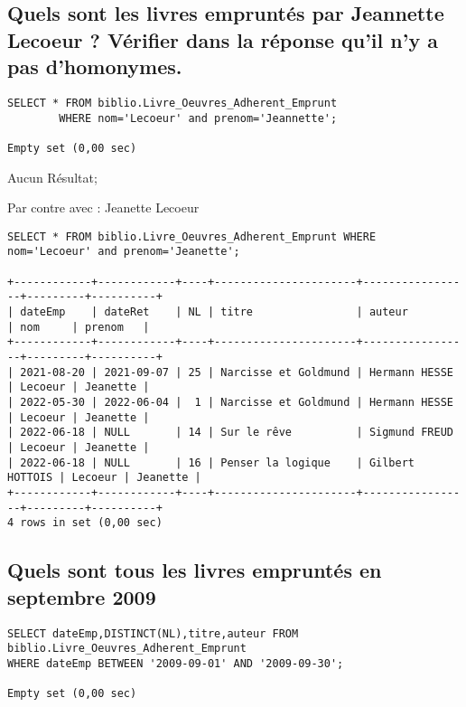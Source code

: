 \documentclass[11]{article}
\begin{document}
\subsection{Quels sont les livres empruntés par Jeannette Lecoeur ? Vérifier dans
	la réponse qu'il n'y a pas d'homonymes.}


\begin{verbatim}
SELECT * FROM biblio.Livre_Oeuvres_Adherent_Emprunt
		WHERE nom='Lecoeur' and prenom='Jeannette';

Empty set (0,00 sec)
\end{verbatim}

Aucun Résultat;

Par contre avec : Jeanette Lecoeur
\begin{verbatim}
SELECT * FROM biblio.Livre_Oeuvres_Adherent_Emprunt WHERE nom='Lecoeur' and prenom='Jeanette';

+------------+------------+----+----------------------+-----------------+---------+----------+
| dateEmp    | dateRet    | NL | titre                | auteur          | nom     | prenom   |
+------------+------------+----+----------------------+-----------------+---------+----------+
| 2021-08-20 | 2021-09-07 | 25 | Narcisse et Goldmund | Hermann HESSE   | Lecoeur | Jeanette |
| 2022-05-30 | 2022-06-04 |  1 | Narcisse et Goldmund | Hermann HESSE   | Lecoeur | Jeanette |
| 2022-06-18 | NULL       | 14 | Sur le rêve          | Sigmund FREUD   | Lecoeur | Jeanette |
| 2022-06-18 | NULL       | 16 | Penser la logique    | Gilbert HOTTOIS | Lecoeur | Jeanette |
+------------+------------+----+----------------------+-----------------+---------+----------+
4 rows in set (0,00 sec)
\end{verbatim}

\subsection{Quels sont tous les livres empruntés en septembre 2009}
\begin{verbatim}
SELECT dateEmp,DISTINCT(NL),titre,auteur FROM biblio.Livre_Oeuvres_Adherent_Emprunt
WHERE dateEmp BETWEEN '2009-09-01' AND '2009-09-30';

Empty set (0,00 sec)
\end{verbatim}
\end{document}
